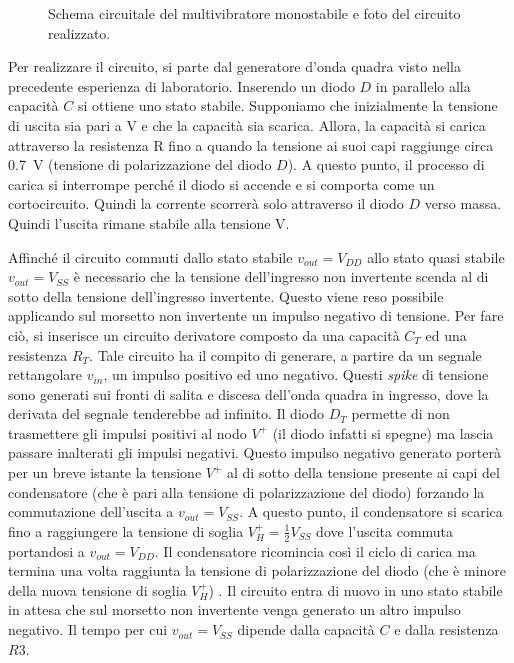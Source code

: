 \begin{figure}[h]
\begin{minipage}{.45\textwidth}
	\end{minipage}
	\caption{Schema circuitale del multivibratore monostabile e foto del circuito realizzato.}
	\label{fig:circuito_1}
\end{figure}
Per realizzare il circuito, si parte dal generatore d'onda quadra visto nella precedente esperienza di laboratorio. Inserendo un diodo $D$ in parallelo alla capacità $C$ si ottiene uno stato stabile. Supponiamo che inizialmente la tensione di uscita sia pari a V e che la capacità sia scarica. Allora, la capacità si carica attraverso la resistenza R fino a quando la tensione ai suoi capi raggiunge circa \SI{0.7}{\volt} (tensione di polarizzazione del diodo $D$). A questo punto, il processo di carica si interrompe perché il diodo si accende e si comporta come un cortocircuito. Quindi la corrente scorrerà solo attraverso il diodo $D$ verso massa. Quindi l'uscita rimane stabile alla tensione V.

\noindent
Affinché il circuito commuti dallo stato stabile $v_{out}=V_{DD}$ allo stato quasi stabile $v_{out}=V_{SS}$ è necessario che la tensione dell'ingresso non invertente scenda al di sotto della tensione dell'ingresso invertente. Questo viene reso possibile applicando sul morsetto non invertente un impulso negativo di tensione. Per fare ciò, si inserisce un circuito derivatore composto da una capacità $C_T$ ed una resistenza $R_T$. Tale circuito ha il compito di generare, a partire da un segnale rettangolare $v_{in}$, un impulso positivo ed uno negativo. Questi \textit{spike} di tensione sono generati sui fronti di salita e discesa dell'onda quadra in ingresso, dove la derivata del segnale tenderebbe ad infinito. Il diodo $D_T$ permette di non trasmettere gli impulsi positivi al nodo $V^+$ (il diodo infatti si spegne) ma lascia passare inalterati gli impulsi negativi.
Questo impulso negativo generato porterà per un breve istante la tensione $V^+$ al di sotto della tensione presente ai capi del condensatore (che è pari alla tensione di polarizzazione del diodo) forzando la commutazione dell'uscita a $v_{out}=V_{SS}$. A questo punto, il condensatore si scarica fino a raggiungere la tensione di soglia $V_H^+=\frac{1}{2}V_{SS}$ dove l'uscita commuta portandosi a $v_{out}=V_{DD}$. Il condensatore ricomincia così il ciclo di carica ma termina una volta raggiunta la tensione di polarizzazione del diodo (che è minore della nuova tensione di soglia $V_H^+$) . Il circuito entra di nuovo in uno stato stabile in attesa che sul morsetto non invertente venga generato un altro impulso negativo. Il tempo per cui $v_{out}=V_{SS}$ dipende dalla capacità $C$ e dalla resistenza $R3$.

